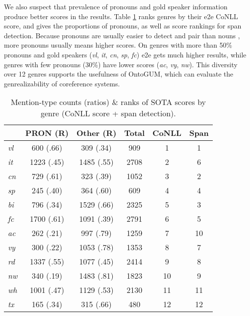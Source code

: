 \documentclass[11pt,a4paper]{article}
\begin{document}
We also suspect that prevalence of pronouns and gold speaker information produce better scores in the results. Table \ref{tab:mention_pair} ranks genres by their e2e CoNLL score, and gives the proportions of pronouns, as well as score rankings for span detection. Because pronouns are usually easier to detect and pair than nouns \citep{durrett-klein-2013-easy}, more pronouns usually means higher scores. On genres with more than 50\% pronouns and gold speakers (\textit{vl}, \textit{it}, \textit{cn}, \textit{sp}, \textit{fc}) e2e gets much higher results, while genres with few pronouns (30\%) have lower scores (\textit{ac}, \textit{vy}, \textit{nw}). This diversity over 12 genres supports the usefulness of OntoGUM, which can evaluate the genrealizability of coreference systems.

\begin{table}[h!tb]
    \centering\small
    \begin{tabular}{l|c|c|c|c|c}
& PRON (R) & Other (R) & Total & CoNLL & Span \\\hline
        \textit{vl} & 600 (.66) & 309 (.34) & 909 & 1 & 1\\
        \textit{it} & 1223 (.45) & 1485 (.55) & 2708 & 2 & 6\\
        \textit{cn} & 729 (.61) & 323 (.39) & 1052 & 3 & 2\\
        \textit{sp} & 245 (.40) & 364 (.60) & 609 & 4 & 4\\
        \textit{bi} & 796 (.34) & 1529 (.66) & 2325 & 5 & 3\\
        \textit{fc} & 1700 (.61) & 1091 (.39) & 2791 & 6 & 5\\
        \textit{ac} & 262 (.21) & 997 (.79) & 1259 & 7 & 10\\
        \textit{vy} & 300 (.22) & 1053 (.78) & 1353 & 8 & 7\\
        \textit{rd} & 1337 (.55) & 1077 (.45) & 2414 & 9 & 8\\
        \textit{nw} & 340 (.19) & 1483 (.81) & 1823 & 10 & 9\\
        \textit{wh} & 1001 (.47) & 1129 (.53) & 2130 & 11 & 11\\
        \textit{tx} & 165 (.34) & 315 (.66) & 480 & 12 & 12\\
        \hline
    \end{tabular}
    \caption{Mention-type counts (ratios) \& ranks of SOTA scores by genre (CoNLL score + span detection).}
    \label{tab:mention_pair}
\end{table}
\end{document}
